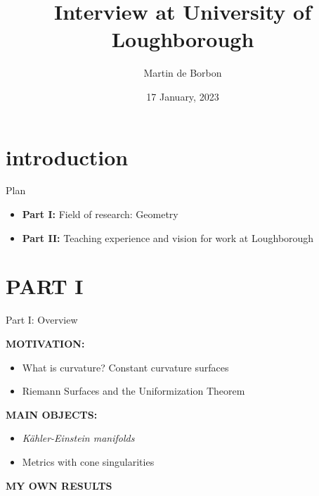 \documentclass{beamer}
\title[]{Interview at University of Loughborough}
\author{Martin de Borbon}
\institute[KCL]{King's College London}
\date[17 January]{17 January, 2023}
\begin{document}
	
\begin{frame}
  \titlepage
\end{frame}


\section{introduction}

\begin{frame}{Plan}
	\begin{center}
	\begin{itemize}
		\item \textbf{Part I:} Field of research: Geometry
		\vspace{5mm}
		\item \textbf{Part II:} Teaching experience and vision for work at Loughborough
	\end{itemize}	
	\end{center}	
\end{frame}

\section{PART I}

\begin{frame}{Part I: Overview}
\begin{center}
\textbf{MOTIVATION:}
\vspace{4mm}
\begin{itemize}
	\item What is curvature? Constant curvature surfaces
	\item Riemann Surfaces and the Uniformization Theorem
\end{itemize}
\vspace{4mm}
\textbf{MAIN OBJECTS:}
\vspace{4mm}
\begin{itemize}
	\item \emph{K\"ahler-Einstein manifolds}
	\item Metrics with cone singularities
\end{itemize}
\vspace{4mm}
\textbf{MY OWN RESULTS}	
\end{center}
\end{frame}
\end{document}
